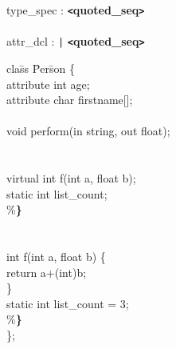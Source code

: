 \begin{tabbing}
\grindent
type\_spec \> : {\bf \texttt{<}quoted\_seq\texttt{>}}\\
\\
attr\_dcl \> : \texttt{|} {\bf \texttt{<}quoted\_seq\texttt{>}}
\end{tabbing}
\begin{tabbing}
cla\=ss \= Per\=son \{\\
\>attribute int age;\\
\>attribute char firstname[];\\
\\
\>void perform(in string, out float);\\
\\
\\
\>\>virtual int f(int a, float b);\\
\>\>static int list\_count;\\
\>\%{\bf \}}\\
\\
\\
\>\>int f(int a, float b) \{\\
\>\>\>return a+(int)b;\\
\>\>\}\\
\>\>static int list\_count = 3;\\
\>\%{\bf \}}\\
\};
\end{tabbing}

